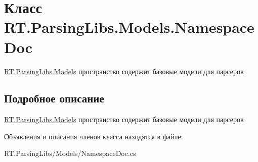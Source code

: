 \hypertarget{class_r_t_1_1_parsing_libs_1_1_models_1_1_namespace_doc}{\section{Класс R\+T.\+Parsing\+Libs.\+Models.\+Namespace\+Doc}
\label{class_r_t_1_1_parsing_libs_1_1_models_1_1_namespace_doc}
}


\hyperlink{namespace_r_t_1_1_parsing_libs_1_1_models}{R\+T.\+Parsing\+Libs.\+Models} пространство содержит базовые модели для парсеров  




\subsection{Подробное описание}
\hyperlink{namespace_r_t_1_1_parsing_libs_1_1_models}{R\+T.\+Parsing\+Libs.\+Models} пространство содержит базовые модели для парсеров 



Объявления и описания членов класса находятся в файле\+:\begin{DoxyCompactItemize}
\item 
R\+T.\+Parsing\+Libs/\+Models/Namespace\+Doc.\+cs\end{DoxyCompactItemize}
